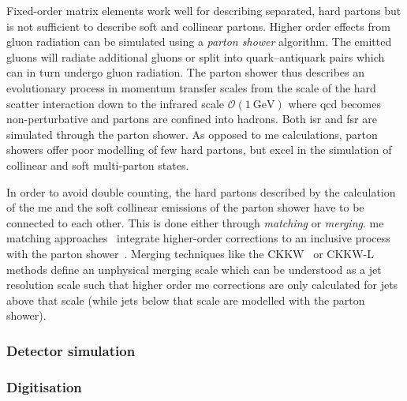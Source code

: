 Fixed-order matrix elements work well for describing separated, hard partons but is not sufficient to describe soft and collinear partons. Higher order effects from gluon radiation can be simulated using a \textit{parton shower} algorithm. The emitted gluons will radiate additional gluons or split into quark--antiquark pairs which can in turn undergo gluon radiation. The parton shower thus describes an evolutionary process in momentum transfer scales from the scale of the hard scatter interaction down to the infrared scale $\mathcal{O}(\SI{1}{\GeV})$ where \gls{qcd} becomes non-perturbative and partons are confined into hadrons. Both \gls{isr} and \gls{fsr} are simulated through the parton shower. As opposed to \gls{me} calculations, parton showers offer poor modelling of few hard partons, but excel in the simulation of collinear and soft multi-parton states.

In order to avoid double counting, the hard partons described by the calculation of the \gls{me} and the soft collinear emissions of the parton shower have to be connected to each other. This is done either through \textit{matching} or \textit{merging}. \gls{me} matching approaches~\cite{Bengtsson:1986hr} integrate higher-order corrections to an inclusive process with the parton shower~\cite{Buckley:2011ms}. Merging techniques like the CKKW~\cite{Catani:2001cc} or CKKW-L~\cite{Lonnblad:2001iq} methods define an unphysical merging scale which can be understood as a jet resolution scale such that higher order \gls{me} corrections are only calculated for jets above that scale (while jets below that scale are modelled with the parton shower).


\subsubsection{Detector simulation}


\subsubsection{Digitisation}










































 